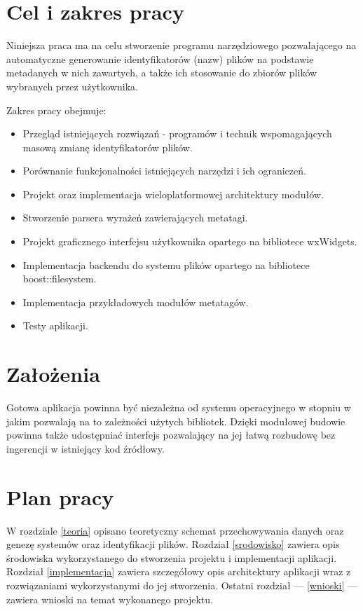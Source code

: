 \section{Cel i zakres pracy}
\par
Niniejsza praca ma na celu stworzenie programu narzędziowego pozwalającego na automatyczne generowanie identyfikatorów (nazw) plików na podstawie metadanych w nich zawartych, a także ich stosowanie do zbiorów plików wybranych przez użytkownika.

\par
Zakres pracy obejmuje:
\begin{itemize}
\item Przegląd istniejących rozwiązań - programów i technik wspomagających masową zmianę identyfikatorów plików.
\item Porównanie funkcjonalności istniejących narzędzi i ich ograniczeń.
\item Projekt oraz implementacja wieloplatformowej architektury modułów.
\item Stworzenie parsera wyrażeń zawierających metatagi.
\item Projekt graficznego interfejsu użytkownika opartego na bibliotece wxWidgets.
\item Implementacja backendu do systemu plików opartego na bibliotece boost::filesystem.
\item Implementacja przykładowych modułów metatagów.
\item Testy aplikacji.
\end{itemize}

\section{Założenia}
\label{zalozenia}
Gotowa aplikacja powinna być niezależna od systemu operacyjnego w stopniu w jakim pozwalają na to zależności użytych bibliotek. Dzięki modułowej budowie powinna także udostępniać interfejs pozwalający na jej łatwą rozbudowę bez ingerencji w istniejący kod źródłowy.

\section{Plan pracy}
\label{plan-pracy}
W rozdziale \ref{teoria} opisano teoretyczny schemat przechowywania danych oraz genezę systemów oraz identyfikacji plików. Rozdział \ref{srodowisko} zawiera opis środowiska wykorzystanego do stworzenia projektu i implementacji aplikacji.
Rozdział \ref{implementacja} zawiera szczegółowy opis architektury aplikacji wraz z rozwiązaniami wykorzystanymi do jej stworzenia.
Ostatni rozdział --- \ref{wnioski} --- zawiera wnioski na temat wykonanego projektu.

\clearpage

